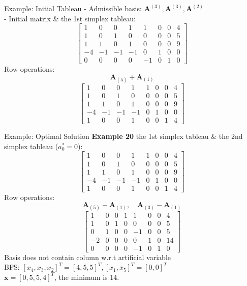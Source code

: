 \documentclass[aspectratio=169,hyperref,UTF8,CJK]{beamer}
\begin{document}
\begin{frame}{Example: Initial Tableau}
- Admissible basis: \(\mathbf{A}^{(3)}, \mathbf{A}^{(3)}, \mathbf{A}^{(2)}\) \\
- Initial matrix \& the 1st simplex tableau:
\[
\begin{bmatrix}
1 & 0 & 0 & 1 & 1 & 0 & 0 & 4 \\
1 & 0 & 1 & 0 & 0 & 0 & 0 & 5 \\
1 & 1 & 0 & 1 & 0 & 0 & 0 & 9 \\
-4 & -1 & -1 & -1 & 0 & 1 & 0 & 0 \\
0 & 0 & 0 & 0 & -1 & 0 & 1 & 0
\end{bmatrix}
\]
Row operations:
\[
\mathbf{A}_{(5)} + \mathbf{A}_{(1)}
\]
\[
\begin{bmatrix}
1 & 0 & 0 & 1 & 1 & 0 & 0 & 4 \\
1 & 0 & 1 & 0 & 0 & 0 & 0 & 5 \\
1 & 1 & 0 & 1 & 0 & 0 & 0 & 9 \\
-4 & -1 & -1 & -1 & 0 & 1 & 0 & 0 \\
1 & 0 & 0 & 1 & 0 & 0 & 1 & 4
\end{bmatrix}
\]
\end{frame}

\begin{frame}{Example: Optimal Solution}
\textbf{Example 20}
the 1st simplex tableau \& the 2nd simplex tableau (\(a_0^* = 0\)):
\[
\begin{bmatrix}
1 & 0 & 0 & 1 & 1 & 0 & 0 & 4 \\
1 & 0 & 1 & 0 & 0 & 0 & 0 & 5 \\
1 & 1 & 0 & 1 & 0 & 0 & 0 & 9 \\
-4 & -1 & -1 & -1 & 0 & 1 & 0 & 0 \\
1 & 0 & 0 & 1 & 0 & 0 & 1 & 4
\end{bmatrix}
\]
Row operations:
\[
\mathbf{A}_{(5)} - \mathbf{A}_{(1)}, \quad \mathbf{A}_{(3)} - \mathbf{A}_{(1)}
\]
\[
\begin{bmatrix}
1 & 0 & 0 & 1 & 1 & 0 & 0 & 4 \\
1 & 0 & 1 & 0 & 0 & 0 & 0 & 5 \\
0 & 1 & 0 & 0 & -1 & 0 & 0 & 5 \\
-2 & 0 & 0 & 0 & 0 & 1 & 0 & 14 \\
0 & 0 & 0 & 0 & -1 & 0 & 1 & 0
\end{bmatrix}
\]
Basis does not contain column w.r.t artificial variable \\
BFS: \([x_4, x_3, x_2]^T = [4, 5, 5]^T, [x_1, x_5]^T = [0, 0]^T\) \\
\(\mathbf{x} = [0, 5, 5, 4]^T\), the minimum is 14.
\end{frame}
\end{document}
